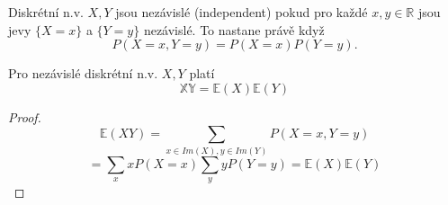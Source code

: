 \documentclass[../main.tex]{subfiles}
\begin{document}
\begin{definition}
    Diskrétní n.v. $X,Y$ jsou nezávislé (independent) pokud pro každé $x,y \in \mathbb{R}$ jsou jevy 
    $\{X=x\}$ a $\{Y=y\}$ nezávislé. To nastane právě když
    \[P(X=x,Y=y) = P(X=x)P(Y=y).\]
\end{definition}

\begin{theorem}
    Pro nezávislé diskrétní n.v. $X,Y$ platí
    \[\mathbb{XY} = \mathbb{E}(X)\mathbb{E}(Y)\]
\end{theorem}
\begin{proof}
    \[\mathbb{E}(XY) = \sum_{x\in Im(X), y \in Im(Y)} P(X=x, Y=y)\]
    \[= \sum_x x P(X=x) \sum_y yP(Y=y) = \mathbb{E}(X)\mathbb{E}(Y)\]
\end{proof}
\end{document}
